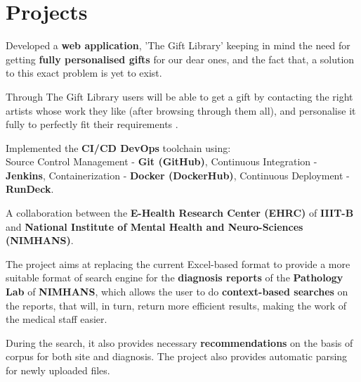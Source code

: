 \documentclass[]{essdee-resume}
\begin{document}
\begin{minipage}[t]{0.66\textwidth} 


\section{Projects}

\vspace{\topsep} %
\begin{tightemize}
\item Developed a \textbf{web application}, 'The Gift Library' keeping in mind the need for getting  \textbf{fully personalised gifts} for our dear ones, and the fact that, a solution to this exact problem is yet to exist.
\item Through The Gift Library users will be able to get a gift by contacting the right artists whose work they like (after browsing through them all), and personalise it fully to perfectly fit their requirements .
\item Implemented the \textbf{CI/CD DevOps} toolchain using: \\
Source Control Management - \textbf{Git (GitHub)}, 
Continuous Integration - \textbf{Jenkins}, 
Containerization - \textbf{Docker (DockerHub)},
Continuous Deployment - \textbf{RunDeck}.\\
\end{tightemize}
\sectionsep



\begin{tightemize}
\item A collaboration between the \textbf{E-Health Research Center (EHRC)} of \textbf{IIIT-B} and  \textbf{National Institute of Mental Health and Neuro-Sciences (NIMHANS)}. 
\item The project aims at replacing the current Excel-based format to provide a more suitable format of search engine for the \textbf{diagnosis reports} of the \textbf{Pathology Lab} of \textbf{NIMHANS}, which allows the user to do \textbf{context-based searches} on the reports, that will, in turn, return more efficient results, making the work of the medical staff easier.
\item During the search, it also provides necessary \textbf{recommendations} on the basis of corpus for both site and diagnosis. The project also provides automatic parsing for newly uploaded files. 
\end{tightemize}
\sectionsep


\end{minipage}
\end{document}
